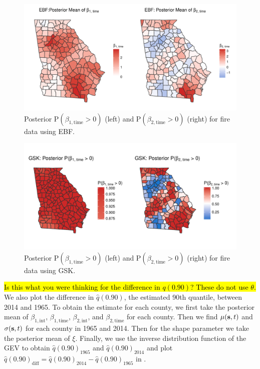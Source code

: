 \documentclass[11pt]{article}
\begin{document}
\begin{figure}[htbp]  %
  \centering
  \includegraphics[width=\linewidth]{plots/fire-ebf-post-betatimepos.pdf}
  \caption{Posterior P$(\beta_{1, \text{time}} > 0)$ (left) and P$(\beta_{2, \text{time}} > 0)$ (right) for fire data using EBF.}
  \label{ebfig:fire-ebfpostbeta1pos}
\end{figure}

\begin{figure}[htbp]  %
  \centering
  \includegraphics[width=\linewidth]{plots/fire-gsk-post-betatimepos.pdf}
  \caption{Posterior P$(\beta_{1, \text{time}} > 0)$ (left) and P$(\beta_{2, \text{time}} > 0)$ (right) for fire data using GSK.}
  \label{ebfig:fire-gskpostbeta1pos}
\end{figure}

\hl{Is this what you were thinking for the difference in $q(0.90)$? These do not use $\theta$.}
We also plot the difference in $\hat{q}(0.90)$, the estimated 90th quantile, between 2014 and 1965.
To obtain the estimate for each county, we first take the posterior mean of $\beta_{1, \text{int}}$, $\beta_{1, \text{time}}$, $\beta_{2, \text{int}}$, and $\beta_{2, \text{time}}$ for each county.
Then we find $\mu(\mbox{\bf s}, t)$ and $\sigma(\mbox{\bf s}, t)$ for each county in 1965 and 2014.
Then for the shape parameter we take the posterior mean of $\xi$.
Finally, we use the inverse distribution function of the GEV to obtain $\hat{q}(0.90)_{1965}$ and $\hat{q}(0.90)_{2014}$ and plot \mbox{$\hat{q}(0.90)_\text{diff} = \hat{q}(0.90)_{2014} - \hat{q}(0.90)_{1965}$} in .
\end{document}
